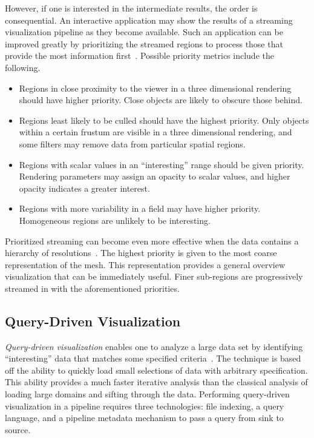 \documentclass[journal,twocolumn,10pt,letterpaper,twoside]{IEEEtran}
\newcommand*{\lcite}[1]{~\cite{#1}}
\newcommand*{\keyterm}[1]{\emph{#1}}
\newenvironment{packeditemize}{
  \begin{itemize}
    \setlength{\topsep}{0pt}
    \setlength{\itemsep}{0pt}
    \setlength{\parskip}{0pt}
    \setlength{\parsep}{0pt}
    \setlength{\partopsep}{0pt}
}{
  \end{itemize}
}
\begin{document}
However, if one is interested in the intermediate results, the order is
consequential.  An interactive application may show the results of a
streaming visualization pipeline as they become available.  Such an
application can be improved greatly by prioritizing the streamed regions to
process those that provide the most information first\lcite{Ahrens2007}.
Possible priority metrics include the following.
\begin{packeditemize}
\item Regions in close proximity to the viewer in a three dimensional
  rendering should have higher priority.  Close objects are likely to
  obscure those behind.
\item Regions least likely to be culled should have the highest priority.
  Only objects within a certain frustum are visible in a three dimensional
  rendering, and some filters may remove data from particular spatial
  regions.
\item Regions with scalar values in an ``interesting'' range should be
  given priority.  Rendering parameters may assign an opacity to scalar
  values, and higher opacity indicates a greater interest.
\item Regions with more variability in a field may have higher priority.
  Homogeneous regions are unlikely to be interesting.
\end{packeditemize}

Prioritized streaming can become even more effective when the data contains
a hierarchy of resolutions\lcite{Ahrens2009}.  The highest priority is
given to the most coarse representation of the mesh.  This representation
provides a general overview visualization that can be immediately useful.
Finer sub-regions are progressively streamed in with the aforementioned
priorities.

\subsection{Query-Driven Visualization}
\label{sec:QueryDrivenVisualization}

\keyterm{Query-driven visualization} enables one to analyze a large data
set by identifying ``interesting'' data that matches some specified
criteria\lcite{Stockinger2005,Gosink2008}.  The technique is based off the
ability to quickly load small selections of data with arbitrary
specification.  This ability provides a much faster iterative analysis than
the classical analysis of loading large domains and sifting through the
data.  Performing query-driven visualization in a pipeline requires three
technologies: file indexing, a query language, and a pipeline metadata
mechanism to pass a query from sink to source.
\end{document}
